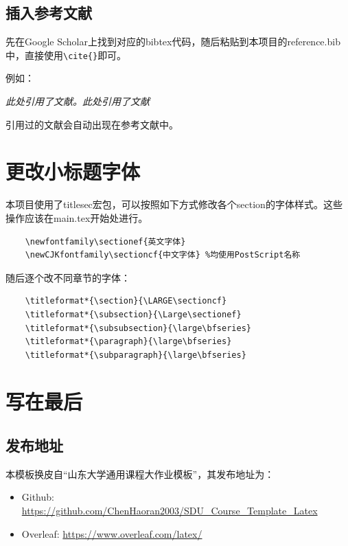 \documentclass[12pt,hyperref,a4paper,UTF8]{ctexart}
\begin{document}
\subsection{插入参考文献}
先在Google Scholar上找到对应的bibtex代码，随后粘贴到本项目的reference.bib中，直接使用\verb|\cite{}|即可。

例如：


   \textit{ 此处引用了文献\cite{OFDMAbackscatter}。此处引用了文献\cite{DigiScatter}}


引用过的文献会自动出现在参考文献中。



\section{更改小标题字体}
本项目使用了titlesec宏包，可以按照如下方式修改各个section的字体样式。这些操作应该在main.tex开始处进行。
\begin{verbatim}
    \newfontfamily\sectionef{英文字体}
    \newCJKfontfamily\sectioncf{中文字体} %均使用PostScript名称
\end{verbatim}
随后逐个改不同章节的字体：
\begin{verbatim}
    \titleformat*{\section}{\LARGE\sectioncf}
    \titleformat*{\subsection}{\Large\sectionef}
    \titleformat*{\subsubsection}{\large\bfseries}
    \titleformat*{\paragraph}{\large\bfseries}
    \titleformat*{\subparagraph}{\large\bfseries}
\end{verbatim}

\section{写在最后}
\subsection{发布地址}
本模板换皮自“山东大学通用课程大作业模板”，其发布地址为：
\begin{itemize}
    \item Github: \url{https://github.com/ChenHaoran2003/SDU_Course_Template_Latex}
    \item Overleaf:  \url{https://www.overleaf.com/latex/}
\end{itemize}


\end{document}
